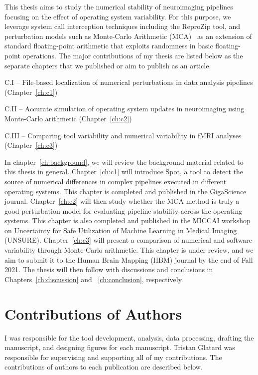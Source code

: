 This thesis aims to study the numerical stability of neuroimaging pipelines focusing on the effect
of operating system variability. For this purpose, we leverage system call interception techniques including the
ReproZip tool, and perturbation models such as Monte-Carlo Arithmetic (MCA)~\cite{Parker1997-qq} as an extension of
standard floating-point arithmetic that exploits randomness in basic floating-point operations. The major
contributions of my thesis are listed below as the separate chapters that we published or aim to publish as an article.

C.I – File-based localization of numerical perturbations in data analysis pipelines (Chapter~\ref{ch:c1})

C.II – Accurate simulation of operating system updates in neuroimaging using Monte-Carlo arithmetic (Chapter~\ref{ch:c2})

C.III – Comparing tool variability and numerical variability in fMRI analyses (Chapter~\ref{ch:c3})


In chapter~\ref{ch:background}, we will review the background material related to this thesis in general.
Chapter~\ref{ch:c1} will introduce Spot, a tool to detect the source of numerical differences in complex pipelines
executed in different operating systems. This chapter is completed and published in the
GigaScience journal. Chapter~\ref{ch:c2} will then study whether the MCA method is truly a good perturbation
model for evaluating pipeline stability across the operating systems. This chapter is also completed and published
in the MICCAI workshop on Uncertainty for Safe Utilization of Machine Learning in Medical Imaging (UNSURE).
Chapter~\ref{ch:c3} will present a comparison of numerical and software variability through Monte-Carlo arithmetic.
This chapter is under review, and we aim to submit it to the Human Brain Mapping (HBM) journal by the end of Fall 2021.
The thesis will then follow with discussions and conclusions in Chapters~\ref{ch:discussion} and ~\ref{ch:conclusion}, respectively.



\section{Contributions of Authors}

I was responsible for the tool development, analysis, data processing, drafting the manuscript, and designing figures for each manuscript. 
Tristan Glatard was responsible for supervising and supporting all of my contributions.
The contributions of authors to each publication are described below.

